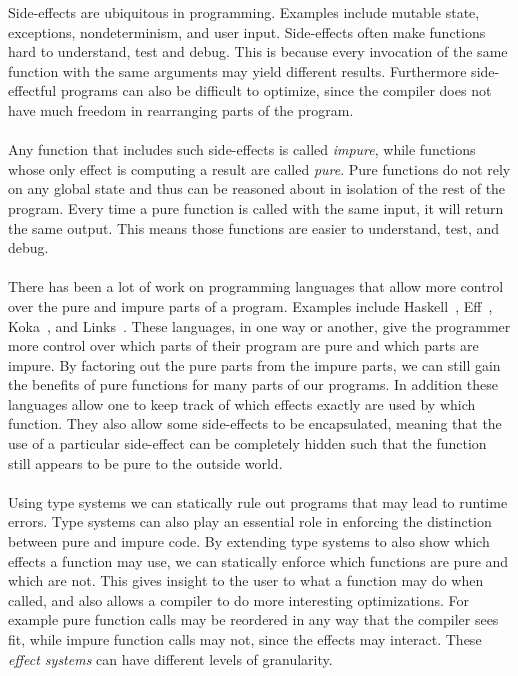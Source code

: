 Side-effects are ubiquitous in programming.
Examples include mutable state, exceptions, nondeterminism, and user input.
Side-effects often make functions hard to understand, test and debug.
This is because every invocation of the same function with the same arguments may yield different results.
Furthermore side-effectful programs can also be difficult to optimize, since the compiler does not have much freedom in rearranging parts of the program.
\\\\
Any function that includes such side-effects is called \emph{impure}, while functions whose only effect is computing a result are called \emph{pure}.
Pure functions do not rely on any global state and thus can be reasoned about in isolation of the rest of the program.
Every time a pure function is called with the same input, it will return the same output.
This means those functions are easier to understand, test, and debug.
\\\\
There has been a lot of work on programming languages that allow more control over the pure and impure parts of a program.
Examples include Haskell~\autocite{haskell}, Eff~\autocite{eff1}, Koka~\autocite{koka2}, and Links~\autocite{links}.
These languages, in one way or another, give the programmer more control over which parts of their program are pure and which parts are impure.
By factoring out the pure parts from the impure parts, we can still gain the benefits of pure functions for many parts of our programs.
In addition these languages allow one to keep track of which effects exactly are used by which function.
They also allow some side-effects to be encapsulated, meaning that the use of a particular side-effect can be completely hidden such that the function still appears to be pure to the outside world.
\\\\
Using type systems we can statically rule out programs that may lead to runtime errors.
Type systems can also play an essential role in enforcing the distinction between pure and impure code.
By extending type systems to also show which effects a function may use, we can statically enforce which functions are pure and which are not.
This gives insight to the user to what a function may do when called, and also allows a compiler to do more interesting optimizations.
For example pure function calls may be reordered in any way that the compiler sees fit, while impure function calls may not, since the effects may interact.
These \emph{effect systems} can have different levels of granularity.
